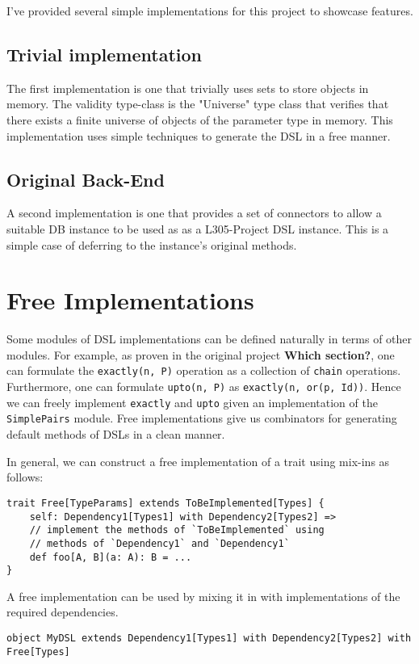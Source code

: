 \documentclass{report}
\newcommand \2[0]{\textbf{2}}
\newcommand \3[0]{\textbf{3}}
\newcommand{\todo}[1]{\textbf{#1}}
\begin{document}
I've provided several simple implementations for this project to showcase features.
\section{Trivial implementation}
The first implementation is one that trivially uses sets  to store objects in memory. The validity type-class is the "Universe" type class that verifies that there exists a finite universe of objects of the parameter type in memory. This implementation uses simple techniques to generate the DSL in a free manner.

\section{Original Back-End}
A second implementation is one that provides a set of connectors to allow a suitable DB instance to be used as as a L305-Project DSL instance. This is a simple case of deferring to the instance's original methods.


\chapter{Free Implementations}
Some modules of DSL implementations can be defined naturally in terms of other modules. For example, as proven in the original project \todo{Which section?}, one can formulate the \texttt{exactly(n, P)} operation as a collection of \texttt{chain} operations. Furthermore, one can formulate \texttt{upto(n, P)} as \texttt{exactly(n, or(p, Id))}. Hence we can freely implement \texttt{exactly} and \texttt{upto} given an implementation of the \texttt{SimplePairs} module. Free implementations give us combinators for generating default methods of DSLs in a clean manner.

In general, we can construct a free implementation of a trait using mix-ins as follows:

\begin{verbatim}
trait Free[TypeParams] extends ToBeImplemented[Types] {
    self: Dependency1[Types1] with Dependency2[Types2] =>
    // implement the methods of `ToBeImplemented` using 
    // methods of `Dependency1` and `Dependency1`
    def foo[A, B](a: A): B = ...
}
\end{verbatim}

A free implementation can be used by mixing it in with implementations of the required dependencies.

\begin{verbatim}
object MyDSL extends Dependency1[Types1] with Dependency2[Types2] with Free[Types]
\end{verbatim}
\end{document}
